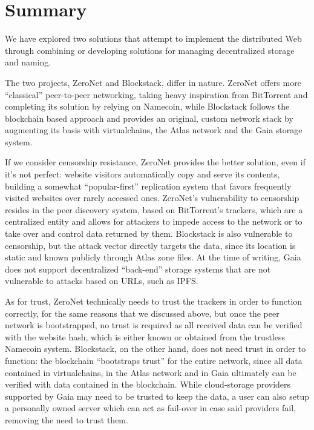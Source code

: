 \documentclass[mscthesis]{usiinfthesis}
\begin{document}
\section{Summary}

We have explored two solutions that attempt to implement the distributed Web through combining or developing solutions for managing decentralized storage and naming.

The two projects, ZeroNet and Blockstack, differ in nature. ZeroNet offers more ``classical'' peer-to-peer networking, taking heavy inspiration from BitTorrent and completing its solution by relying on Namecoin, while Blockstack follows the blockchain based approach and provides an original, custom network stack by augmenting its basis with virtualchains, the Atlas network and the Gaia storage system.

If we consider censorship resistance, ZeroNet provides the better solution, even if it's not perfect: website visitors automatically copy and serve its contents, building a somewhat ``popular-first'' replication system that favors frequently visited websites over rarely accessed ones. ZeroNet's vulnerability to censorship resides in the peer discovery system, based on BitTorrent's trackers, which are a centralized entity and allows for attackers to impede access to the network or to take over and control data returned by them. Blockstack is also vulnerable to censorship, but the attack vector directly targets the data,
since its location is static and known publicly through Atlas zone files. At the time of writing, Gaia does not support decentralized ``back-end'' storage systems that are not vulnerable to attacks based on URLs, such as IPFS.

As for trust, ZeroNet technically needs to trust the trackers in order to function correctly, for the same reasons that we discussed above, but once the peer network is bootstrapped, no trust is required as all received data can be verified with the website hash, which is either known or obtained from the trustless Namecoin system. Blockstack, on the other hand, does not need trust in order to function: the blockchain ``bootstraps trust'' for the entire network, since all data contained in virtualchains, in the Atlas network and in Gaia ultimately can be verified with data contained in the blockchain. While cloud-storage providers supported by Gaia may need to be trusted to keep the data, a user can also setup a personally owned server which can act as fail-over in case said providers fail, removing the need to trust them.
\end{document}
